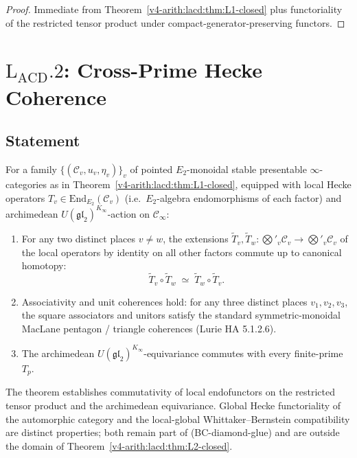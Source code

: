 \begin{proof}
Immediate from Theorem~\ref{v4-arith:lacd:thm:L1-closed} plus functoriality
of the restricted tensor product under compact-generator-preserving
functors.
\end{proof}

\section{\(\mathrm{L}_{\mathrm{ACD}}.2\): Cross-Prime Hecke Coherence}
\label{v4-arith:lacd:L2}

\subsection{Statement}

\begin{theorem}
\label{v4-arith:lacd:thm:L2-closed}
For a family
\(\{(\mathcal{C}_{v}, u_{v}, \eta_{v})\}_{v}\) of pointed
\(E_{2}\)-monoidal stable presentable \(\infty\)-categories as in
Theorem~\ref{v4-arith:lacd:thm:L1-closed}, equipped with local Hecke
operators \(T_{v} \in \mathrm{End}_{E_{2}}(\mathcal{C}_{v})\) (i.e.\
\(E_{2}\)-algebra endomorphisms of each factor) and archimedean
\(U(\mathfrak{gl}_{2})^{K_{\infty}}\)-action on \(\mathcal{C}_{\infty}\):
\begin{enumerate}
\item For any two distinct places \(v \neq w\), the extensions
\(\widetilde{T}_{v}, \widetilde{T}_{w}: \bigotimes'_{v}\mathcal{C}_{v}
\to \bigotimes'_{v}\mathcal{C}_{v}\) of the local operators by
identity on all other factors commute up to canonical homotopy:
\begin{equation}
\label{v4-arith:lacd:eq:T-commute}
\widetilde{T}_{v} \circ \widetilde{T}_{w}
\;\simeq\;
\widetilde{T}_{w} \circ \widetilde{T}_{v}.
\end{equation}
\item Associativity and unit coherences hold: for any three distinct
places \(v_{1}, v_{2}, v_{3}\), the square associators and unitors
satisfy the standard symmetric-monoidal MacLane pentagon / triangle
coherences (Lurie HA 5.1.2.6).
\item The archimedean
\(U(\mathfrak{gl}_{2})^{K_{\infty}}\)-equivariance commutes with every
finite-prime \(T_{p}\).
\end{enumerate}
\end{theorem}

\begin{remark}
\label{v4-arith:lacd:rem:L2-formal-domain}
The theorem establishes commutativity of local endofunctors on the
restricted tensor product and the archimedean equivariance. Global
Hecke functoriality of the automorphic category and the local-global
Whittaker--Bernstein compatibility are distinct properties; both remain
part of (BC-diamond-glue) and are outside the domain of
Theorem~\ref{v4-arith:lacd:thm:L2-closed}.
\end{remark}

